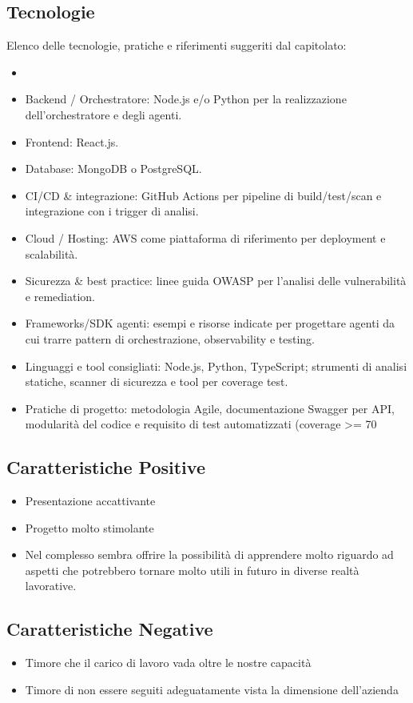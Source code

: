 \documentclass[a4paper,12pt]{article}
\begin{document}
    \subsection{Tecnologie}
    Elenco delle tecnologie, pratiche e riferimenti suggeriti dal capitolato:
    \begin{itemize}
        \item 
        \item Backend / Orchestratore: Node.js e/o Python per la realizzazione dell’orchestratore e degli agenti. 
        \item Frontend: React.js.
        \item Database: MongoDB o PostgreSQL. 
        \item CI/CD \& integrazione: GitHub Actions per pipeline di build/test/scan e integrazione con i trigger di analisi. 
        \item Cloud / Hosting: AWS come piattaforma di riferimento per deployment e scalabilità. 
        \item Sicurezza \& best practice: linee guida OWASP per l’analisi delle vulnerabilità e remediation. 
        \item Frameworks/SDK agenti: esempi e risorse indicate per progettare agenti da cui trarre pattern di orchestrazione, observability e testing. 
        \item Linguaggi e tool consigliati: Node.js, Python, TypeScript; strumenti di analisi statiche, scanner di sicurezza e tool per coverage test. 
        \item Pratiche di progetto: metodologia Agile, documentazione Swagger per API, modularità del codice e requisito di test automatizzati (coverage >= 70%
    \end{itemize}   
    \subsection{Caratteristiche Positive}
    \begin{itemize}
        \item Presentazione accattivante
        \item Progetto molto stimolante
        \item Nel complesso sembra offrire la possibilità di apprendere molto riguardo ad aspetti che potrebbero tornare molto utili in futuro in diverse realtà lavorative. 
    \end{itemize}
    \subsection{Caratteristiche Negative}
        \begin{itemize}
            \item Timore che il carico di lavoro vada oltre le nostre capacità   
            \item Timore di non essere seguiti adeguatamente vista la dimensione dell'azienda 
        \end{itemize}
\end{document}
